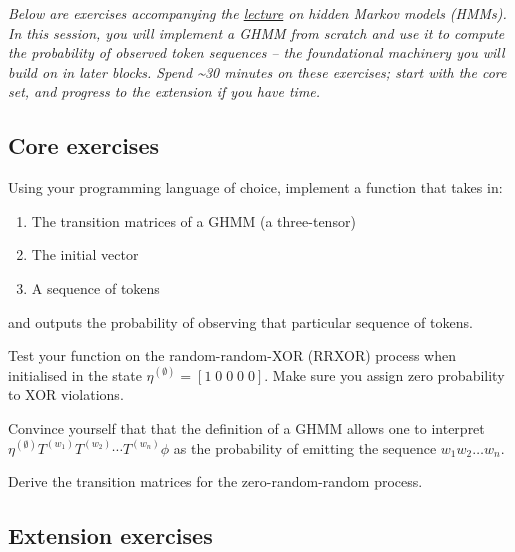 \emph{Below are exercises accompanying the \href{https://iliad-intensive.org/downloads/computational-mechanics/computational-mechanics-slides.pdf}{lecture} on hidden Markov models (HMMs). In this session, you will implement a GHMM from scratch and use it to compute the probability of observed token sequences -- the foundational machinery you will build on in later blocks. Spend \textasciitilde30 minutes on these exercises; start with the core set, and progress to the extension if you have time.}

\subsection{Core exercises}\label{sec:hmm-core}

\begin{exercise}
\label{ex:hmm-core-1}
Using your programming language of choice, implement a function that takes in:

\begin{enumerate}
\item
  The transition matrices of a GHMM (a three-tensor)
\item
  The initial vector
\item
  A sequence of tokens
\end{enumerate}

and outputs the probability of observing that particular sequence of tokens.
\end{exercise}

\begin{exercise}
\label{ex:hmm-core-2}
Test your function on the random-random-XOR (RRXOR) process when initialised in the state \(\eta^{(\emptyset)} = [1\;0\;0\;0\;0]\). Make sure you assign zero probability to XOR violations.
\end{exercise}

\begin{exercise}
\label{ex:hmm-core-3}
Convince yourself that that the definition of a GHMM allows one to interpret \(\eta^{(\emptyset)}T^{(w_1)}T^{(w_2)}\cdots T^{(w_n)}\phi\) as the probability of emitting the sequence \(w_1 w_2 \ldots w_n\).
\end{exercise}

\begin{exercise}
\label{ex:hmm-core-4}
Derive the transition matrices for the zero-random-random process.
\end{exercise}

\subsection{Extension exercises}\label{sec:hmm-ext}

